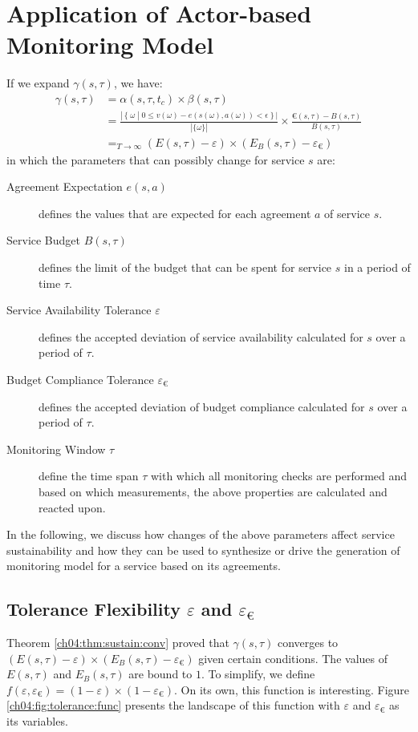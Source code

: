 \section{Application of Actor-based Monitoring Model}
\label{ch04:sec:app}

If we expand $\gamma(s,\tau)$, we have:
\begin{align*}
\gamma(s,\tau) &= \alpha(s,\tau,t_c) \times \beta(s,\tau) \\
 &= \frac{|\, \{\; \omega \; | \; 0 \leq v(\omega) - e(s(\omega),a(\omega)) < \epsilon \; \}\,|}{|\{\omega\}|}
 \times \frac{\euro(s,\tau) - B(s,\tau)}{B(s,\tau)} \\
 &=_{T \rightarrow \infty} (E(s,\tau) - \varepsilon) \times (E_B(s,\tau) - \varepsilon_{\euro})
\end{align*}
in which the parameters that can possibly change for service $s$ are:
\begin{description}
\item[Agreement Expectation $e(s, a)$] defines the values that are expected for each agreement $a$ of service $s$.
\item[Service Budget $B(s,\tau)$] defines the limit of the budget that can be spent for service $s$ in a period of time $\tau$.
\item[Service Availability Tolerance $\varepsilon$] defines the accepted deviation of service availability calculated for $s$ over a period of $\tau$.
\item[Budget Compliance Tolerance $\varepsilon_{\euro}$] defines the accepted deviation of budget compliance calculated for $s$ over a period of $\tau$.
\item[Monitoring Window $\tau$] define the time span $\tau$ with which all monitoring checks are performed and based on which measurements, the above properties are calculated and reacted upon.
\end{description}
In the following, we discuss how changes of the above parameters affect service sustainability and how they can be used to synthesize or drive the generation of monitoring model for a service based on its agreements.

\subsection{Tolerance Flexibility $\varepsilon$ and $\varepsilon_{\euro}$}

Theorem \ref{ch04:thm:sustain:conv} proved that $\gamma(s,\tau)$ converges to $(E(s,\tau)-\varepsilon)\times(E_B(s,\tau)-\varepsilon_{\euro})$ given certain conditions.
The values of $E(s,\tau)$ and $E_B(s,\tau)$ are bound to $1$.
To simplify, we define $f(\varepsilon,\varepsilon_{\euro}) = (1 - \varepsilon)\times(1-\varepsilon_{\euro})$.
On its own, this function is interesting.
Figure \ref{ch04:fig:tolerance:func} presents the landscape of this function with $\varepsilon$ and $\varepsilon_{\euro}$ as its variables.
% 

